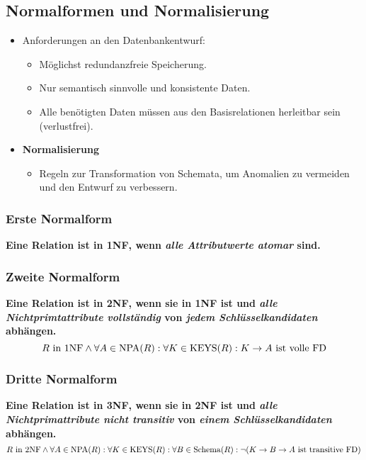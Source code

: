 \subsection{Normalformen und Normalisierung} %
\begin{itemize}
	\item Anforderungen an den Datenbankentwurf:
		\begin{itemize}
			\item Möglichst redundanzfreie Speicherung.
			\item Nur semantisch sinnvolle und konsistente Daten.
			\item Alle benötigten Daten müssen aus den Basisrelationen herleitbar sein (verlustfrei).
		\end{itemize}
	\item \textbf{Normalisierung}
		\begin{itemize}
			\item Regeln zur Transformation von Schemata, um Anomalien zu vermeiden und den Entwurf zu verbessern.
		\end{itemize}
\end{itemize}


\subsubsection{Erste Normalform} %
	\textbf{Eine Relation ist in 1NF, wenn \textit{alle Attributwerte atomar} sind.}


\subsubsection{Zweite Normalform} %
	\textbf{Eine Relation ist in 2NF, wenn sie in 1NF ist und \textit{alle Nichtprimtattribute vollständig} von \textit{jedem Schlüsselkandidaten} abhängen.}
	\begin{equation*}
		R \text{ in 1NF} \land \forall A \in \text{NPA}(R) : \forall K \in \operatorname{KEYS}(R) : K \rightarrow A \text{ ist volle FD}
	\end{equation*}


\subsubsection{Dritte Normalform} %
	\textbf{Eine Relation ist in 3NF, wenn sie in 2NF ist und \textit{alle Nichtprimattribute nicht transitiv} von \textit{einem Schlüsselkandidaten} abhängen.}
	\begin{equation*}
		R \text{ in 2NF} \land \forall A \in \text{NPA}(R) : \forall K \in \operatorname{KEYS}(R) : \forall B \in \operatorname{Schema}(R) : \lnot(K \rightarrow B \rightarrow A \text{ ist transitive FD})
	\end{equation*}

